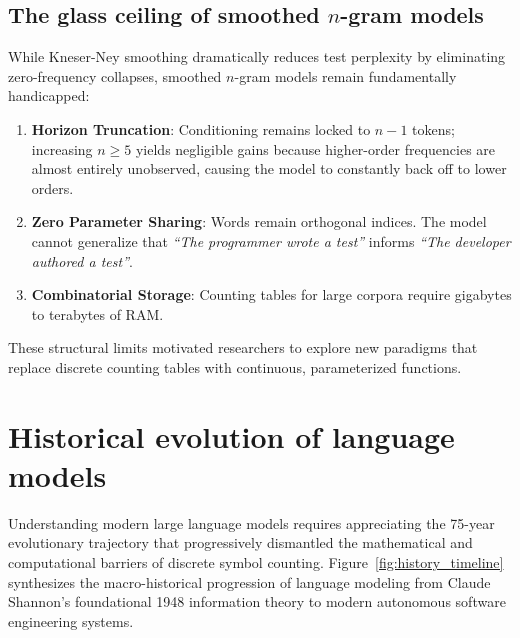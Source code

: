 \documentclass[../../main.tex]{subfiles}
\begin{document}
\subsection{The glass ceiling of smoothed \texorpdfstring{$n$}{n}-gram models}
While Kneser-Ney smoothing dramatically reduces test perplexity by eliminating zero-frequency collapses, smoothed $n$-gram models remain fundamentally handicapped:
\begin{enumerate}
    \item \textbf{Horizon Truncation}: Conditioning remains locked to $n-1$ tokens; increasing $n \ge 5$ yields negligible gains because higher-order frequencies are almost entirely unobserved, causing the model to constantly back off to lower orders.
    \item \textbf{Zero Parameter Sharing}: Words remain orthogonal indices. The model cannot generalize that \textit{``The programmer wrote a test''} informs \textit{``The developer authored a test''}.
    \item \textbf{Combinatorial Storage}: Counting tables for large corpora require gigabytes to terabytes of RAM.
\end{enumerate}
These structural limits motivated researchers to explore new paradigms that replace discrete counting tables with continuous, parameterized functions.


\section{Historical evolution of language models}
\label{sec:history_lms}

Understanding modern large language models requires appreciating the 75-year evolutionary trajectory that progressively dismantled the mathematical and computational barriers of discrete symbol counting. Figure~\ref{fig:history_timeline} synthesizes the macro-historical progression of language modeling from Claude Shannon's foundational 1948 information theory to modern autonomous software engineering systems.
\end{document}
